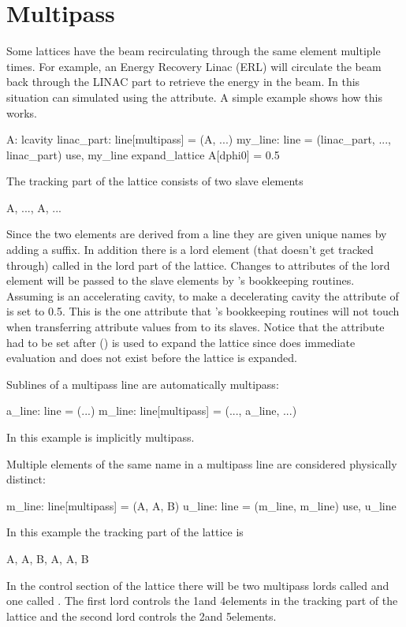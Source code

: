 \section{Multipass}
\label{s:multipass}

Some lattices have the beam recirculating through the same element
multiple times. For example, an Energy Recovery Linac (ERL) will
circulate the beam back through the LINAC part to retrieve the energy
in the beam. In \bmad this situation can simulated using the
 attribute. A simple example shows how this works.
\begin{example}
  A: lcavity
  linac_part: line[multipass] = (A, ...)
  my_line: line = (linac_part, ..., linac_part)
  use, my_line
  expand_lattice
  A[dphi0] = 0.5
\end{example}
The tracking part of the lattice consists of two slave elements
\begin{example}
  A, ..., A, ...
\end{example}
Since the two elements are derived from a  line they are
given unique names by adding a  suffix. In addition there is
a lord element (that doesn't get tracked through) called  in the
lord part of the lattice. Changes to attributes of the lord 
element will be passed to the slave elements by \bmad's bookkeeping
routines. Assuming  is an accelerating cavity, to make
 a decelerating cavity the  attribute of
 is set to 0.5. This is the one attribute that \bmad's
bookkeeping routines will not touch when transferring attribute values
from  to its slaves. Notice that the  attribute had to
be set after  ()
is used to expand the lattice since
\bmad does immediate evaluation and  does not exist before
the lattice is expanded.

Sublines of a multipass line are automatically multipass:
\begin{example}
  a_line: line = (...)
  m_line: line[multipass] = (..., a_line, ...)
\end{example}
In this example  is implicitly multipass.

Multiple elements of the same name in a multipass line are considered 
physically distinct:
\begin{example}
  m_line: line[multipass] = (A, A, B)
  u_line: line = (m_line, m_line)
  use, u_line
\end{example}
In this example the tracking part of the lattice is
\begin{example}
  A, A, B, A, A, B
\end{example}
In the control section of the lattice there will be two multipass
lords called  and one called . The first  lord 
controls the 1\St and 4\Th elements in the tracking part of the lattice 
and the second  lord controls the 2\Nd and 5\Th elements.

